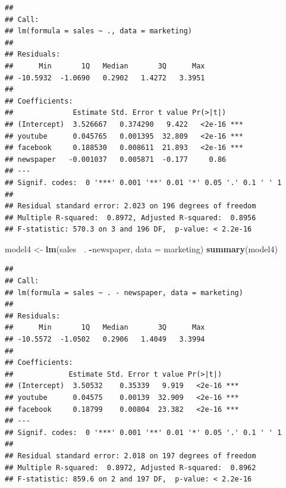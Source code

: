 \documentclass[]{article}
\newenvironment{Shaded}{\begin{snugshade}}{\end{snugshade}}
\newcommand{\KeywordTok}[1]{\textcolor[rgb]{0.13,0.29,0.53}{\textbf{#1}}}
\newcommand{\DataTypeTok}[1]{\textcolor[rgb]{0.13,0.29,0.53}{#1}}
\newcommand{\StringTok}[1]{\textcolor[rgb]{0.31,0.60,0.02}{#1}}
\newcommand{\OperatorTok}[1]{\textcolor[rgb]{0.81,0.36,0.00}{\textbf{#1}}}
\newcommand{\NormalTok}[1]{#1}
\begin{document}
\begin{verbatim}
## 
## Call:
## lm(formula = sales ~ ., data = marketing)
## 
## Residuals:
##      Min       1Q   Median       3Q      Max 
## -10.5932  -1.0690   0.2902   1.4272   3.3951 
## 
## Coefficients:
##              Estimate Std. Error t value Pr(>|t|)    
## (Intercept)  3.526667   0.374290   9.422   <2e-16 ***
## youtube      0.045765   0.001395  32.809   <2e-16 ***
## facebook     0.188530   0.008611  21.893   <2e-16 ***
## newspaper   -0.001037   0.005871  -0.177     0.86    
## ---
## Signif. codes:  0 '***' 0.001 '**' 0.01 '*' 0.05 '.' 0.1 ' ' 1
## 
## Residual standard error: 2.023 on 196 degrees of freedom
## Multiple R-squared:  0.8972, Adjusted R-squared:  0.8956 
## F-statistic: 570.3 on 3 and 196 DF,  p-value: < 2.2e-16
\end{verbatim}

\begin{Shaded}
\begin{Highlighting}[]
\NormalTok{model4 <-}\StringTok{ }\KeywordTok{lm}\NormalTok{(sales }\OperatorTok{~}\NormalTok{. }\OperatorTok{-}\NormalTok{newspaper, }\DataTypeTok{data =}\NormalTok{ marketing)}
\KeywordTok{summary}\NormalTok{(model4)}
\end{Highlighting}
\end{Shaded}

\begin{verbatim}
## 
## Call:
## lm(formula = sales ~ . - newspaper, data = marketing)
## 
## Residuals:
##      Min       1Q   Median       3Q      Max 
## -10.5572  -1.0502   0.2906   1.4049   3.3994 
## 
## Coefficients:
##             Estimate Std. Error t value Pr(>|t|)    
## (Intercept)  3.50532    0.35339   9.919   <2e-16 ***
## youtube      0.04575    0.00139  32.909   <2e-16 ***
## facebook     0.18799    0.00804  23.382   <2e-16 ***
## ---
## Signif. codes:  0 '***' 0.001 '**' 0.01 '*' 0.05 '.' 0.1 ' ' 1
## 
## Residual standard error: 2.018 on 197 degrees of freedom
## Multiple R-squared:  0.8972, Adjusted R-squared:  0.8962 
## F-statistic: 859.6 on 2 and 197 DF,  p-value: < 2.2e-16
\end{verbatim}

\begin{Shaded}
\end{Shaded}
\end{document}
